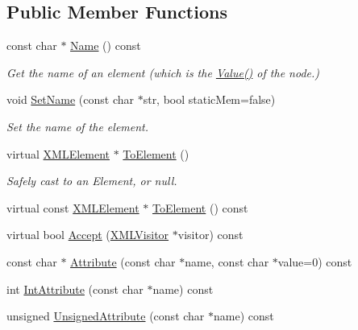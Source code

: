 \subsection*{Public Member Functions}
\begin{DoxyCompactItemize}
\item 
const char $\ast$ \hyperlink{classtinyxml2_1_1_x_m_l_element_a8bff355472bce2c60d4b50a212bf7f5f}{Name} () const 
\begin{DoxyCompactList}\small\item\em Get the name of an element (which is the \hyperlink{classtinyxml2_1_1_x_m_l_node_a7682be117e3b2b4ebfd517c1acaaadbf}{Value()} of the node.) \end{DoxyCompactList}\item 
void \hyperlink{classtinyxml2_1_1_x_m_l_element_a97712009a530d8cb8a63bf705f02b4f1}{Set\-Name} (const char $\ast$str, bool static\-Mem=false)
\begin{DoxyCompactList}\small\item\em Set the name of the element. \end{DoxyCompactList}\item 
virtual \hyperlink{classtinyxml2_1_1_x_m_l_element}{X\-M\-L\-Element} $\ast$ \hyperlink{classtinyxml2_1_1_x_m_l_element_ad9ff5c2dbc15df36cf664ce1b0ea0a5d}{To\-Element} ()
\begin{DoxyCompactList}\small\item\em Safely cast to an Element, or null. \end{DoxyCompactList}\item 
virtual const \hyperlink{classtinyxml2_1_1_x_m_l_element}{X\-M\-L\-Element} $\ast$ \hyperlink{classtinyxml2_1_1_x_m_l_element_a55acab615353ddabab48271f95816b0d}{To\-Element} () const 
\item 
virtual bool \hyperlink{classtinyxml2_1_1_x_m_l_element_a36d65438991a1e85096caf39ad13a099}{Accept} (\hyperlink{classtinyxml2_1_1_x_m_l_visitor}{X\-M\-L\-Visitor} $\ast$visitor) const 
\item 
const char $\ast$ \hyperlink{classtinyxml2_1_1_x_m_l_element_a7bdebdf1888074087237f3dd03912740}{Attribute} (const char $\ast$name, const char $\ast$value=0) const 
\item 
int \hyperlink{classtinyxml2_1_1_x_m_l_element_af86f05771c11a73a2896b662bb589ef5}{Int\-Attribute} (const char $\ast$name) const 
\item 
unsigned \hyperlink{classtinyxml2_1_1_x_m_l_element_aa5a41367b5118acec42a87f5f94cec2d}{Unsigned\-Attribute} (const char $\ast$name) const 

\end{DoxyCompactItemize}

